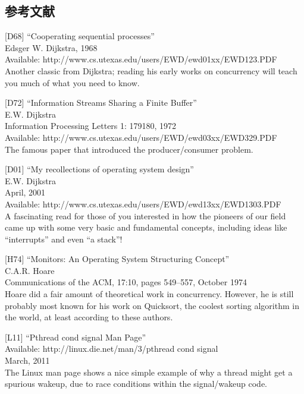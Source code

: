 \hypertarget{ux53c2ux8003ux6587ux732e-19}{%
\subsection*{参考文献}\label{ux53c2ux8003ux6587ux732e-19}}

{[}D68{]} ``Cooperating sequential processes''\\
Edsger W. Dijkstra, 1968\\
Available: http://www.cs.utexas.edu/users/EWD/ewd01xx/EWD123.PDF\\
Another classic from Dijkstra; reading his early works on concurrency
will teach you much of what you need to know.

{[}D72{]} ``Information Streams Sharing a Finite Buffer''\\
E.W. Dijkstra\\
Information Processing Letters 1: 179180, 1972\\
Available: http://www.cs.utexas.edu/users/EWD/ewd03xx/EWD329.PDF\\
The famous paper that introduced the producer/consumer problem.

{[}D01{]} ``My recollections of operating system design''\\
E.W. Dijkstra\\
April, 2001\\
Available: http://www.cs.utexas.edu/users/EWD/ewd13xx/EWD1303.PDF\\
A fascinating read for those of you interested in how the pioneers of
our field came up with some very basic and fundamental concepts,
including ideas like ``interrupts'' and even ``a stack''!

{[}H74{]} ``Monitors: An Operating System Structuring Concept''\\
C.A.R. Hoare\\
Communications of the ACM, 17:10, pages 549--557, October 1974\\
Hoare did a fair amount of theoretical work in concurrency. However, he
is still probably most known for his work on Quicksort, the coolest
sorting algorithm in the world, at least according to these authors.

{[}L11{]} ``Pthread cond signal Man Page''\\
Available: http://linux.die.net/man/3/pthread cond signal\\
March, 2011\\
The Linux man page shows a nice simple example of why a thread might get
a spurious wakeup, due to race conditions within the signal/wakeup code.

